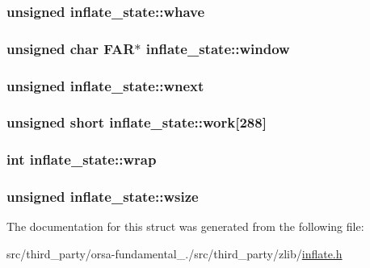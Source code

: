 \subsubsection[{whave}]{\setlength{\rightskip}{0pt plus 5cm}unsigned inflate\+\_\+state\+::whave}\label{structinflate__state_a6b56aabe80412784eadc1068981c9d00}
\hypertarget{structinflate__state_a9cc4c0bde426383731394dcf91c40673}{}
\subsubsection[{window}]{\setlength{\rightskip}{0pt plus 5cm}unsigned char {\bf F\+A\+R}$\ast$ inflate\+\_\+state\+::window}\label{structinflate__state_a9cc4c0bde426383731394dcf91c40673}
\hypertarget{structinflate__state_a1c3ec583646b68713e5c92151064a6dd}{}
\subsubsection[{wnext}]{\setlength{\rightskip}{0pt plus 5cm}unsigned inflate\+\_\+state\+::wnext}\label{structinflate__state_a1c3ec583646b68713e5c92151064a6dd}
\hypertarget{structinflate__state_a85403907f7f5b9d355821ffa2591456c}{}
\subsubsection[{work}]{\setlength{\rightskip}{0pt plus 5cm}unsigned short inflate\+\_\+state\+::work\mbox{[}288\mbox{]}}\label{structinflate__state_a85403907f7f5b9d355821ffa2591456c}
\hypertarget{structinflate__state_a990d157b5c0d4ba178c3361de9ce6561}{}
\subsubsection[{wrap}]{\setlength{\rightskip}{0pt plus 5cm}int inflate\+\_\+state\+::wrap}\label{structinflate__state_a990d157b5c0d4ba178c3361de9ce6561}
\hypertarget{structinflate__state_acca16ca86216760eaf307bf71e15e470}{}
\subsubsection[{wsize}]{\setlength{\rightskip}{0pt plus 5cm}unsigned inflate\+\_\+state\+::wsize}\label{structinflate__state_acca16ca86216760eaf307bf71e15e470}


The documentation for this struct was generated from the following file\+:\begin{DoxyCompactItemize}
\item 
src/third\+\_\+party/orsa-\/fundamental\+\_./src/third\+\_\+party/zlib/\hyperlink{inflate_8h}{inflate.\+h}\end{DoxyCompactItemize}
